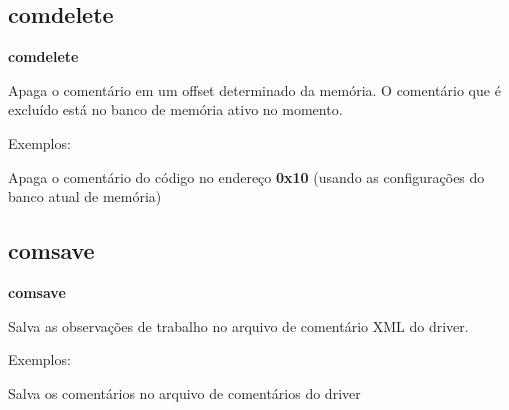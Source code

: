 \documentclass[letterpaper,10pt,brazil]{sphinxmanual}
\begin{document}
\subsection{comdelete}
\label{debugger/annotation:debugger-command-comdelete}\label{debugger/annotation:comdelete}
\begin{DUlineblock}{0em}
\item[]
\begin{DUlineblock}{\DUlineblockindent}
\item[] \textbf{comdelete}
\item[] 
\end{DUlineblock}
\item[] Apaga o comentário em um offset determinado da memória. O comentário que é excluído está no banco de memória ativo no momento.
\item[] 
\item[] Exemplos:
\item[] 
\item[]
\begin{DUlineblock}{\DUlineblockindent}
\item[] 
\item[] 
\end{DUlineblock}
\item[] Apaga o comentário do código no endereço \textbf{0x10} (usando as configurações do banco atual de memória)
\end{DUlineblock}
\begin{quote}
\label{debugger/annotation:debugger-command-comsave}\end{quote}


\subsection{comsave}
\label{debugger/annotation:debugger-command-comsave}\label{debugger/annotation:comsave}
\begin{DUlineblock}{0em}
\item[]
\begin{DUlineblock}{\DUlineblockindent}
\item[] \textbf{comsave}
\item[] 
\end{DUlineblock}
\item[] Salva as observações de trabalho no arquivo de comentário XML do driver.
\item[] 
\item[] Exemplos:
\item[] 
\item[]
\begin{DUlineblock}{\DUlineblockindent}
\item[] 
\item[] 
\end{DUlineblock}
\item[] Salva os comentários no arquivo de comentários do driver
\end{DUlineblock}
\begin{quote}
\label{debugger/annotation:debugger-command-comlist}\end{quote}
\end{document}
